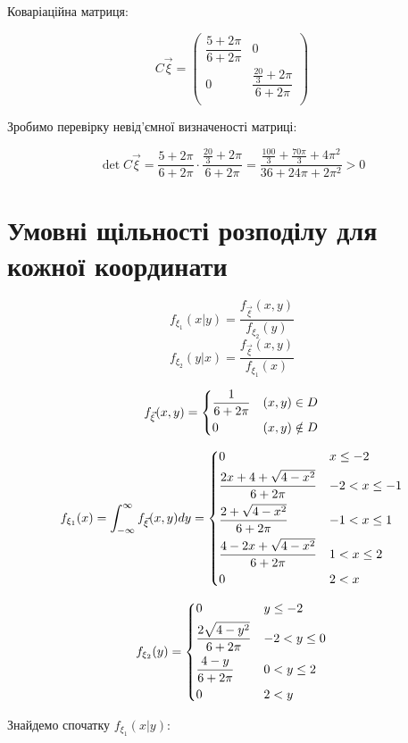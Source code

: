 \documentclass[14pt, a4paper, ukrainian]{extreport}
\begin{document}
 	Коваріаційна матриця:
 	
 	$$C{\vec\xi} = \left(  
 	\begin{matrix}
 		\dfrac{5+2\pi}{6+2\pi} & 0\\
 		0 & \dfrac{\frac{20}{3} + 2\pi}{6 + 2\pi}\\
 	\end{matrix}\right)
 	$$
 	
 	Зробимо перевірку невід'ємної визначеності матриці: 
 	
 	$$\det{C{\vec\xi}}  = \frac{5 + 2\pi}{6+2\pi} \cdot \frac{\frac{20}{3} + 2\pi}{6+2\pi} = \frac{\frac{100}{3} + \frac{70\pi}{3} + 4\pi^2}{36 + 24\pi + 2\pi^2} > 0$$
 	 	
 	\section{Умовні щільності розподілу для кожної координати}
 	
 	$$f_{\xi_1}(x|y) = \dfrac{f_{\vec \xi}(x, y)}{f_{\xi_2}(y)} $$
 	$$f_{\xi_2}(y|x) = \dfrac{f_{\vec \xi}(x, y)}{f_{\xi_1}(x)} $$
 	
 	$$f_{\vec \xi}(x, y) = 
 	\begin{dcases}
 		\frac{1}{6+2\pi} & (x, y) \in D\\
 		0 & (x, y) \notin D\\
 	\end{dcases}
 	$$
 	
 	$$f_{\xi_1}(x) = \int_{-\infty}^{\infty}f_{\vec\xi}(x, y)dy =
 	\begin{dcases}
 		0 & x \le -2\\
 		\frac{2x+4+\sqrt{4-x^2}}{6+2\pi} & -2 < x \le -1\\
 		\frac{2+\sqrt{4-x^2}}{6+2\pi} & -1 < x \le 1\\
 		\frac{4-2x+\sqrt{4-x^2}}{6+2\pi} & 1 < x \le 2\\
 		0 & 2 < x
 	\end{dcases}
 	$$	
 	
 		$$f_{\xi_2}(y) = 
 	\begin{dcases}
 		0 & y \le -2\\
 		\dfrac{2\sqrt{4-y^2}}{6+2\pi} & -2 < y \le 0\\
 		\frac{4-y}{6+2\pi} & 0 < y \le 2\\
 		0 & 2 < y
 	\end{dcases}
 	$$
 	
 	Знайдемо спочатку $f_{\xi_1}(x|y)$:
 	
\end{document}
